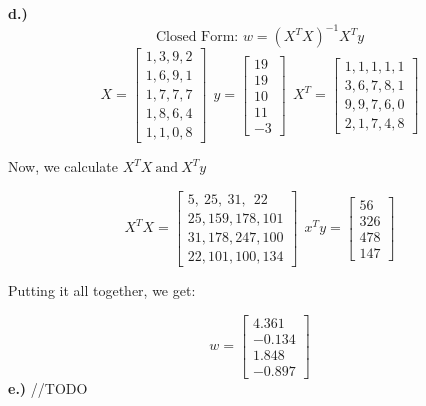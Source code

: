 \documentclass[11pt]{article}
\begin{document}
\textbf{d.)}
\begin{equation}
\text{Closed Form: } w = (X^TX)^{-1}X^Ty
\end{equation}
\[X =
\begin{bmatrix}
1, 3, 9, 2\\
1, 6, 9, 1\\
1, 7, 7, 7\\
1, 8, 6, 4\\
1, 1, 0, 8
\end{bmatrix}
\ \ y =
\begin{bmatrix}
19\\
19\\
10\\
11\\
-3
\end{bmatrix}
\ \ X^T = 
\begin{bmatrix}
1, 1, 1, 1, 1\\
3, 6, 7, 8, 1\\
9, 9, 7, 6, 0\\
2, 1, 7, 4, 8
\end{bmatrix}
\]
\begin{center}
\pagebreak
Now, we calculate $X^TX \ \text{and} \ X^Ty$
\end{center}
\[X^TX = 
\begin{bmatrix}
5, \ 25, \ 31, \ \ 22\\
25, 159, 178, 101\\
31, 178, 247, 100\\
22, 101, 100, 134
\end{bmatrix}
\ \ x^Ty = 
\begin{bmatrix}
56\\
326\\
478\\
147
\end{bmatrix}
\]
\begin{center}
Putting it all together, we get:
\end{center}
\[w= 
\begin{bmatrix}
4.361\\
-0.134\\
1.848\\
-0.897
\end{bmatrix}\]
\textbf{e.)} //TODO
\end{document}
